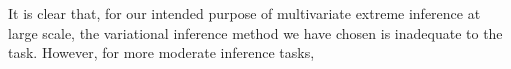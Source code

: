 \begin{comment}
    \begin{itemize}
        \item Desire for more comprehensive data (additional sources of flooding?  rain?)
        \item Value in each model approach
        \item Additional steps to be taken / model extensions worth exploring
        \begin{itemize}
            \item Factor analysis for the regression model
            \item Mixed fitting approaches -- Gibbs-ing cluster assignment, variational methods on cluster parameters.
        \end{itemize}
    \end{itemize}
\end{comment}

It is clear that, for our intended purpose of multivariate extreme inference at large scale,
    the variational inference method we have chosen is inadequate to the task.  However, for
    more moderate inference tasks,




